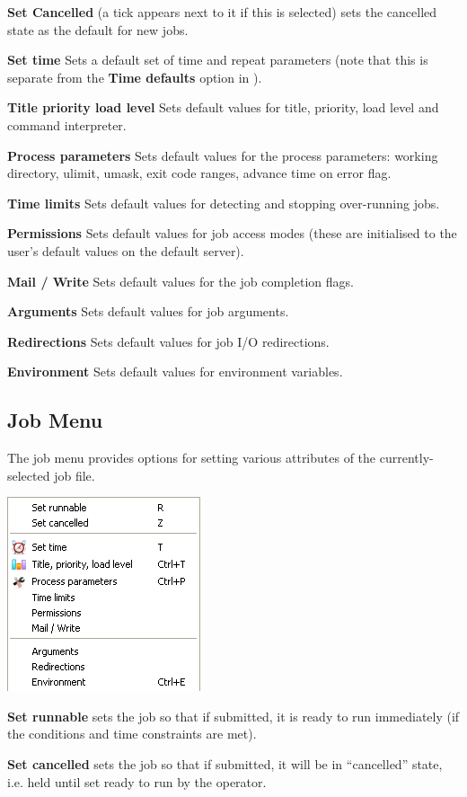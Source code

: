 \textbf{Set Cancelled} (a tick appears next to it if this is selected) sets the cancelled state as the default for new jobs.

\textbf{Set time} Sets a default set of time and repeat parameters (note that this is separate from the \textbf{Time defaults} option
in ).

\textbf{Title priority load level} Sets default values for title, priority, load level and command interpreter.

\textbf{Process parameters} Sets default values for the
process parameters: working directory, ulimit, umask, exit code ranges,
advance time on error flag.

\textbf{Time limits} Sets default values for detecting and stopping over-running jobs.

\textbf{Permissions} Sets default values for job access modes (these are initialised to the user's default values on the default server).

\textbf{Mail / Write} Sets default values for the job completion flags.

\textbf{Arguments} Sets default values for job arguments.

\textbf{Redirections} Sets default values for job I/O redirections.

\textbf{Environment} Sets default values for environment variables.

\subsection{Job Menu}
The job menu provides options for setting various attributes of the currently-selected job file.

\includegraphics{img/btrwjobmenu.png} 

\textbf{Set runnable} sets the job so that if submitted, it is ready to run immediately (if the conditions
and time constraints are met).

\textbf{Set cancelled} sets the job so that if submitted, it will be in ``cancelled'' state, i.e. held until
set ready to run by the operator.

